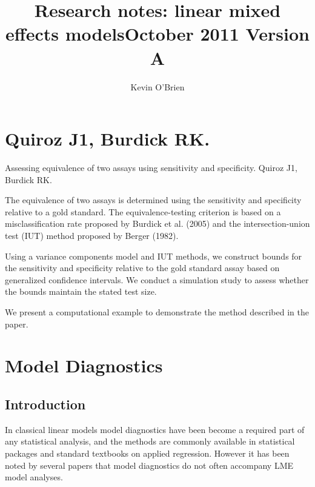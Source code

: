 \documentclass[12pt, a4paper]{report}
\title{Research notes: linear mixed effects models}
\author{ } \date{ }
\theoremstyle{plain}
\theoremstyle{definition}
\theoremstyle{remark}
\begin{document}
\author{Kevin O'Brien}
\title{October 2011 Version A}

\chapter{Quiroz J1, Burdick RK.}
Assessing equivalence of two assays using sensitivity and specificity.
Quiroz J1, Burdick RK.


The equivalence of two assays is determined using the sensitivity and specificity relative to a gold standard.
The equivalence-testing criterion is based on a misclassification rate proposed by Burdick et al. (2005) and
the intersection-union test (IUT) method proposed by Berger (1982). 

Using a variance components model and IUT methods, we construct bounds for the sensitivity and specificity 
relative to the gold standard assay based on generalized confidence intervals. We conduct a simulation study 
to assess whether the bounds maintain the stated test size. 

We present a computational example to demonstrate the method described in the paper.


\chapter{Model Diagnostics}
\section{Introduction}%
In classical linear models model diagnostics have been become a required part of any statistical analysis, and the methods are commonly available in statistical packages and standard textbooks on applied regression. However it has been noted by several papers that model diagnostics do not often accompany LME model analyses.
\end{document}
